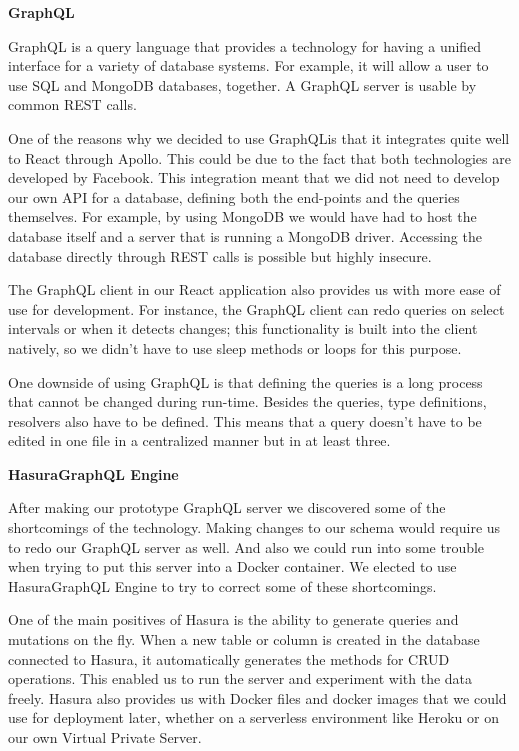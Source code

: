 
\textbf{GraphQL}

GraphQL is a query language that provides a technology for having a unified interface for a variety of database systems. For example, it will allow a user to use SQL and MongoDB databases, together. A GraphQL server is usable by common REST calls.
 
One of the reasons why we decided to use GraphQLis that it integrates quite well to React through Apollo. This could be due to the fact that both technologies are developed by Facebook. This integration meant that we did not need to develop our own API for a database, defining both the end-points and the queries themselves. For example, by using MongoDB we would have had to host the database itself and a server that is running a MongoDB driver. Accessing the database directly through REST calls is possible but highly insecure.

The GraphQL client in our React application also provides us with more ease of use for development. For instance, the GraphQL client can redo queries on select intervals or when it detects changes; this functionality is built into the client natively, so we didn’t have to use sleep methods or loops for this purpose.

One downside of using GraphQL is that defining the queries is a long process that cannot be changed during run-time. Besides the queries, type definitions, resolvers also have to be defined. This means that a query doesn’t have to be edited in one file in a centralized manner but in at least three.

\textbf{HasuraGraphQL Engine}

After making our prototype GraphQL server we discovered some of the shortcomings of the technology. Making changes to our schema would require us to redo our GraphQL server as well. And also we could run into some trouble when trying to put this server into a Docker container. We elected to use HasuraGraphQL Engine to try to correct some of these shortcomings.
 
One of the main positives of Hasura is the ability to generate queries and mutations on the fly. When a new table or column is created in the database connected to Hasura, it automatically generates the methods for CRUD operations. This enabled us to run the server and experiment with the data freely.
Hasura also provides us with Docker files and docker images that we could use for deployment later, whether on a serverless environment like Heroku or on our own Virtual Private Server. 


